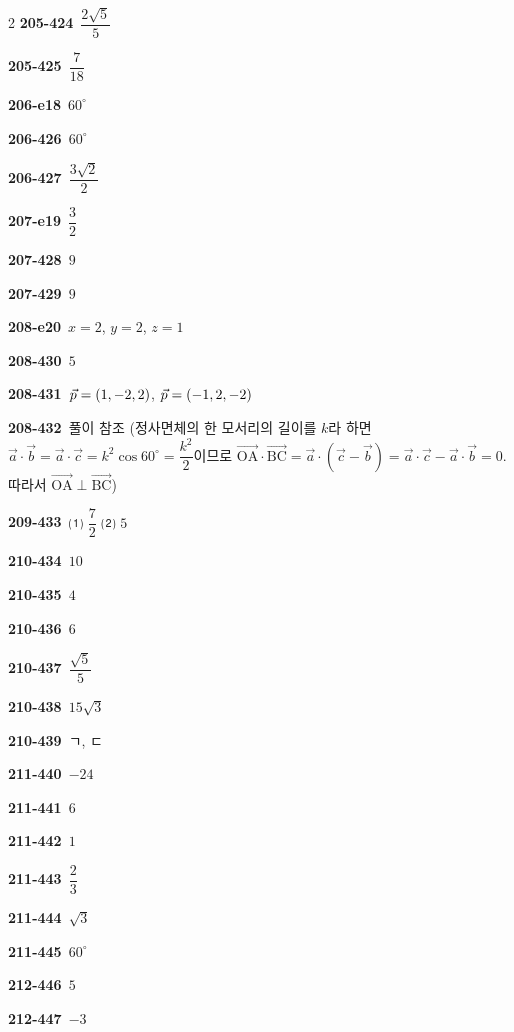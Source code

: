 \documentclass[10pt,a4paper]{article}
\newcommand{\pt}[1]{\mathrm{#1}}
\begin{document}
\begin{multicols}{2}
\noindent\textbf{205-424}\ $\dfrac{2\sqrt{5}}{5}$\par
\noindent\textbf{205-425}\ $\dfrac{7}{18}$\par
\noindent\textbf{206-e18}\ $60^\circ$\par
\noindent\textbf{206-426}\ $60^\circ$\par
\noindent\textbf{206-427}\ $\dfrac{3\sqrt{2}}{2}$\par
\noindent\textbf{207-e19}\ $\dfrac{3}{2}$\par
\noindent\textbf{207-428}\ $9$\par
\noindent\textbf{207-429}\ $9$\par
\noindent\textbf{208-e20}\ $x=2$, $y=2$, $z=1$\par
\noindent\textbf{208-430}\ $5$\par
\noindent\textbf{208-431}\ $\vec{p}=(1{,}\mkern3mu\mathopen{}-2{,}\mkern3mu\mathopen{}2)$, $\vec{p}=(-1{,}\mkern3mu\mathopen{}2{,}\mkern3mu\mathopen{}-2)$\par
\noindent\textbf{208-432}\ 풀이 참조 (정사면체의 한 모서리의 길이를 $k$라 하면 $\vec{a}\cdot\vec{b}=\vec{a}\cdot\vec{c}=k^2\cos60^\circ=\dfrac{k^2}{2}$이므로 $\overrightarrow{\pt{OA}}\cdot\overrightarrow{\pt{BC}}=\vec{a}\cdot(\vec{c}-\vec{b})=\vec{a}\cdot\vec{c}-\vec{a}\cdot\vec{b}=0$. 따라서 $\overrightarrow{\pt{OA}}\perp\overrightarrow{\pt{BC}}$)\par
\noindent\textbf{209-433}\ ⑴ $\dfrac{7}{2}$ ⑵ $5$\par
\noindent\textbf{210-434}\ $10$\par
\noindent\textbf{210-435}\ $4$\par
\noindent\textbf{210-436}\ $6$\par
\noindent\textbf{210-437}\ $\dfrac{\sqrt{5}}{5}$\par
\noindent\textbf{210-438}\ $15\sqrt{3}$\par
\noindent\textbf{210-439}\ ㄱ, ㄷ\par
\noindent\textbf{211-440}\ $-24$\par
\noindent\textbf{211-441}\ $6$\par
\noindent\textbf{211-442}\ $1$\par
\noindent\textbf{211-443}\ $\dfrac{2}{3}$\par
\noindent\textbf{211-444}\ $\sqrt{3}$\par
\noindent\textbf{211-445}\ $60^\circ$\par
\noindent\textbf{212-446}\ $5$\par
\noindent\textbf{212-447}\ $-3$\par

\end{multicols}
\end{document}
